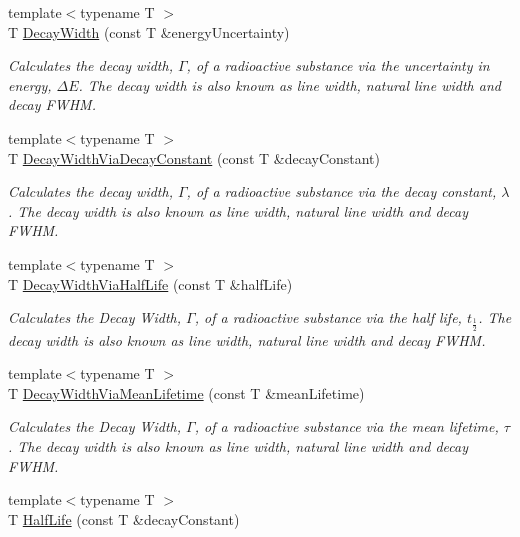 \begin{DoxyCompactItemize}
{\footnotesize template$<$typename T $>$ }\\T \hyperlink{group___decay_width_gae232ec8bb39710131be898c057a25620}{Decay\+Width} (const T \&energy\+Uncertainty)
\begin{DoxyCompactList}\small\item\em Calculates the decay width, $\Gamma$, of a radioactive substance via the uncertainty in energy, $\Delta E$. The decay width is also known as line width, natural line width and decay F\+W\+HM. \end{DoxyCompactList}\item 
{\footnotesize template$<$typename T $>$ }\\T \hyperlink{group___decay_width_ga143a666966efecc535a59bb4f36a79c6}{Decay\+Width\+Via\+Decay\+Constant} (const T \&decay\+Constant)
\begin{DoxyCompactList}\small\item\em Calculates the decay width, $\Gamma$, of a radioactive substance via the decay constant, $\lambda$. The decay width is also known as line width, natural line width and decay F\+W\+HM. \end{DoxyCompactList}\item 
{\footnotesize template$<$typename T $>$ }\\T \hyperlink{group___decay_width_ga1113224b24790a2e34032f9e90ad55c6}{Decay\+Width\+Via\+Half\+Life} (const T \&half\+Life)
\begin{DoxyCompactList}\small\item\em Calculates the Decay Width, $\Gamma$, of a radioactive substance via the half life, $t_{\frac{1}{2}}$. The decay width is also known as line width, natural line width and decay F\+W\+HM. \end{DoxyCompactList}\item 
{\footnotesize template$<$typename T $>$ }\\T \hyperlink{group___decay_width_ga0b65d991f3f3d72cf09a4a7b343a01ca}{Decay\+Width\+Via\+Mean\+Lifetime} (const T \&mean\+Lifetime)
\begin{DoxyCompactList}\small\item\em Calculates the Decay Width, $\Gamma$, of a radioactive substance via the mean lifetime, $\tau$. The decay width is also known as line width, natural line width and decay F\+W\+HM. \end{DoxyCompactList}\item 
{\footnotesize template$<$typename T $>$ }\\T \hyperlink{group___half_life_ga21d268f154fb91c1c556bbfa7fe83ac1}{Half\+Life} (const T \&decay\+Constant)

\end{DoxyCompactItemize}

